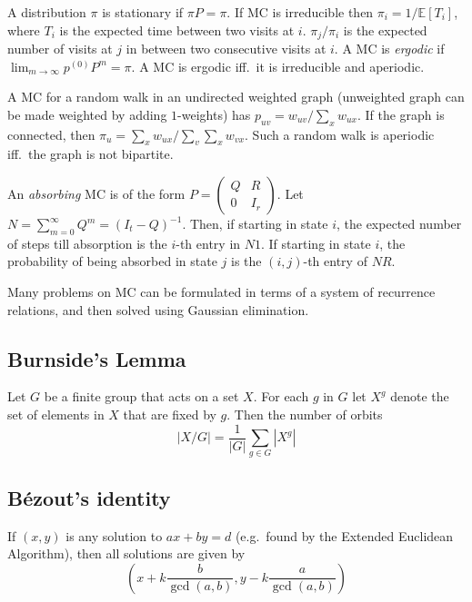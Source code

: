 \documentclass[8pt,a4paper,landscape,oneside]{amsart}
\begin{document}
\begin{multicols*}{3}
            A distribution $\pi$ is stationary if $\pi P = \pi$. If MC is
            irreducible then $\pi_i = 1/\mathbb{E}[T_i]$, where $T_i$ is the
            expected time between two visits at $i$. $\pi_j/\pi_i$ is the expected
            number of visits at $j$ in between two consecutive visits at $i$. A MC
            is \textit{ergodic} if $\lim_{m\to\infty} p^{(0)} P^{m} = \pi$. A MC is
            ergodic iff.\ it is irreducible and aperiodic.

            A MC for a random walk in an undirected weighted graph (unweighted
            graph can be made weighted by adding $1$-weights) has $p_{uv} =
            w_{uv}/\sum_{x} w_{ux}$. If the graph is connected, then $\pi_u =
            \sum_{x} w_{ux} / \sum_{v}\sum_{x} w_{vx}$. Such a random walk is
            aperiodic iff.\ the graph is not bipartite.

            An \textit{absorbing} MC is of the form $P = \left(\begin{matrix} Q & R
            \\ 0 & I_r \end{matrix}\right)$. Let $N = \sum_{m=0}^\infty Q^m = (I_t
            - Q)^{-1}$. Then, if starting in state $i$, the expected number of
            steps till absorption is the $i$-th entry in $N1$. If starting in state
            $i$, the probability of being absorbed in state $j$ is the $(i,j)$-th
            entry of $NR$.

            Many problems on MC can be formulated in terms of a system of
            recurrence relations, and then solved using Gaussian elimination.

        \subsection{Burnside's Lemma}
            Let $G$ be a finite group that acts on a set $X$. For each $g$ in $G$
            let $X^g$ denote the set of elements in $X$ that are fixed by $g$. Then
            the number of orbits \[ |X/G| = \frac{1}{|G|} \sum_{g\in G} |X^g| \]

        \subsection{Bézout's identity}
            If $(x,y)$ is any solution to $ax+by=d$ (e.g.\ found by the Extended
            Euclidean Algorithm), then all solutions are given by \[
            \left(x+k\frac{b}{\gcd(a,b)}, y-k\frac{a}{\gcd(a,b)}\right) \]


\end{multicols*}
\end{document}
